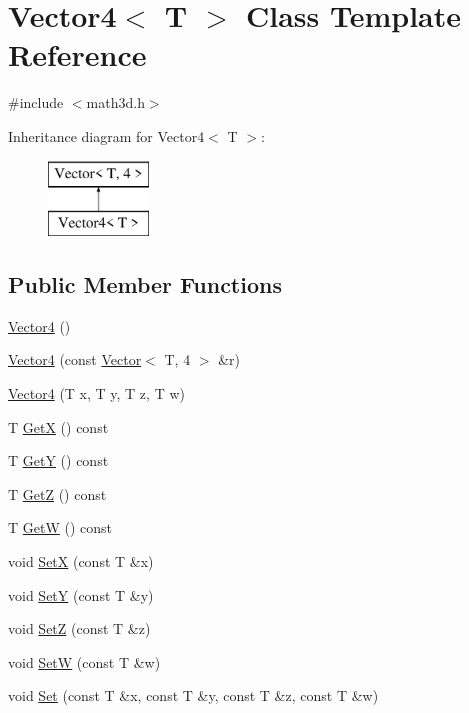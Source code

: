 \hypertarget{class_vector4}{}\section{Vector4$<$ T $>$ Class Template Reference}
\label{class_vector4}


{\ttfamily \#include $<$math3d.\+h$>$}

Inheritance diagram for Vector4$<$ T $>$\+:\begin{figure}[H]
\begin{center}
\leavevmode
\includegraphics[height=2.000000cm]{class_vector4}
\end{center}
\end{figure}
\subsection*{Public Member Functions}
\begin{DoxyCompactItemize}
\item 
\hyperlink{class_vector4_afdef97d94e5697622b5322637028accf}{Vector4} ()
\item 
\hyperlink{class_vector4_acbf5f4e37a678abcc2fa00e0e633f41a}{Vector4} (const \hyperlink{class_vector}{Vector}$<$ T, 4 $>$ \&r)
\item 
\hyperlink{class_vector4_ad0da88beeb8b4f77e05f9faddc21469b}{Vector4} (T x, T y, T z, T w)
\item 
T \hyperlink{class_vector4_a90e0c7b7b1cc89c1faaba14bcd3f585a}{Get\+X} () const 
\item 
T \hyperlink{class_vector4_a7c178a0068d7ec3a77fb8239052bbe42}{Get\+Y} () const 
\item 
T \hyperlink{class_vector4_ad66bdb268d13fc3b8e9b040dd3c7ef03}{Get\+Z} () const 
\item 
T \hyperlink{class_vector4_a12ee3cad6a9f37ed5f71a1f214d324ec}{Get\+W} () const 
\item 
void \hyperlink{class_vector4_a4ac9438f9f5464db3dff215c773a7290}{Set\+X} (const T \&x)
\item 
void \hyperlink{class_vector4_a0529ac9fdbb27baa288cdf9cbcc0ba80}{Set\+Y} (const T \&y)
\item 
void \hyperlink{class_vector4_aa595f39077a0b28f6a3e4b7054b84aed}{Set\+Z} (const T \&z)
\item 
void \hyperlink{class_vector4_a8fb9f197a3ff3d9c2f46ccac6795ac5c}{Set\+W} (const T \&w)
\item 
void \hyperlink{class_vector4_a2ee3defe0236534fd145fb239dbfbaf4}{Set} (const T \&x, const T \&y, const T \&z, const T \&w)
\end{DoxyCompactItemize}



